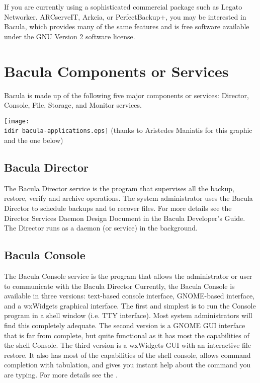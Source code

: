 If you are currently using a sophisticated commercial package such as Legato
Networker. ARCserveIT, Arkeia, or PerfectBackup+, you may be interested in
Bacula, which provides many of the same features and is free software
available under the GNU Version 2 software license. 

\section{Bacula Components or Services}

Bacula is made up of the following five major components or services:
Director, Console, File, Storage, and Monitor services.


\texttt{[image: \\idir bacula-applications.eps]} 
(thanks to Aristedes Maniatis for this graphic and the one below) 

\subsection*{Bacula Director}
   \label{DirDef}
   The Bacula Director service is the program that supervises
   all the backup, restore, verify and archive operations.  The system
   administrator uses the Bacula Director to schedule backups and to
   recover files.  For more details see the Director Services Daemon Design
   Document in the Bacula Developer's Guide.  The Director runs as a daemon
   (or service) in the background.
   \label{UADef}

\subsection*{Bacula Console}

   The Bacula Console service is the program that allows the
   administrator or user to communicate with the Bacula Director
   Currently, the Bacula Console is available in three versions:
   text-based console interface, GNOME-based interface, and a
   wxWidgets graphical interface.
   The first and simplest is to run the Console program in a shell window
   (i.e.  TTY interface).  Most system administrators will find this
   completely adequate.  The second version is a GNOME GUI interface that
   is far from complete, but quite functional as it has most the
   capabilities of the shell Console.  The third version is a wxWidgets GUI
   with an interactive file restore.  It also has most of the capabilities
   of the shell console, allows command completion with tabulation, and
   gives you instant help about the command you are typing.  For more
   details see the .

